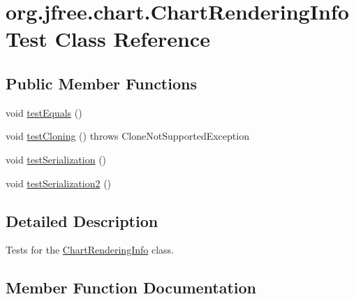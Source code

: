 \hypertarget{classorg_1_1jfree_1_1chart_1_1_chart_rendering_info_test}{}\section{org.\+jfree.\+chart.\+Chart\+Rendering\+Info\+Test Class Reference}
\label{classorg_1_1jfree_1_1chart_1_1_chart_rendering_info_test}
\subsection*{Public Member Functions}
\begin{DoxyCompactItemize}
\item 
void \mbox{\hyperlink{classorg_1_1jfree_1_1chart_1_1_chart_rendering_info_test_a292385bb99fda43b36d7d04489dd11c1}{test\+Equals}} ()
\item 
void \mbox{\hyperlink{classorg_1_1jfree_1_1chart_1_1_chart_rendering_info_test_a84d5d33db661789248962f62f06cbb18}{test\+Cloning}} ()  throws Clone\+Not\+Supported\+Exception 
\item 
void \mbox{\hyperlink{classorg_1_1jfree_1_1chart_1_1_chart_rendering_info_test_a130a4ff5757472efe92856ad30054e29}{test\+Serialization}} ()
\item 
void \mbox{\hyperlink{classorg_1_1jfree_1_1chart_1_1_chart_rendering_info_test_a7c75384b4c62cd4f878f5f9768b7ec31}{test\+Serialization2}} ()
\end{DoxyCompactItemize}


\subsection{Detailed Description}
Tests for the \mbox{\hyperlink{classorg_1_1jfree_1_1chart_1_1_chart_rendering_info}{Chart\+Rendering\+Info}} class. 

\subsection{Member Function Documentation}
\mbox{\label{classorg_1_1jfree_1_1chart_1_1_chart_rendering_info_test_a84d5d33db661789248962f62f06cbb18}} 
